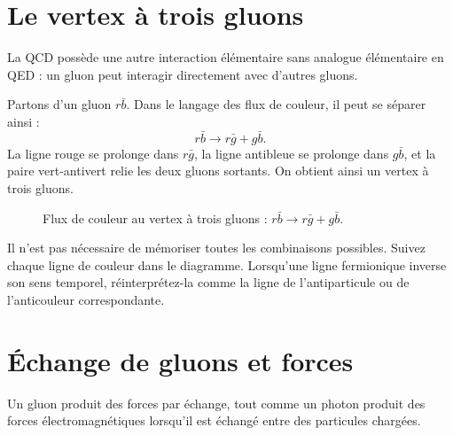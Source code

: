 \section{Le vertex à trois gluons}

La QCD possède une autre interaction élémentaire sans analogue élémentaire en QED : un gluon peut interagir directement avec d’autres gluons.

Partons d’un gluon \(r\bar b\). Dans le langage des flux de couleur, il peut se séparer ainsi :
\begin{equation}
r\bar b
\longrightarrow
r\bar g+g\bar b.
\end{equation}
La ligne rouge se prolonge dans \(r\bar g\), la ligne antibleue se prolonge dans \(g\bar b\), et la paire vert-antivert relie les deux gluons sortants. On obtient ainsi un vertex à trois gluons.

\begin{figure}[h]
\centering
{}
\caption{Flux de couleur au vertex à trois gluons : \(r\bar b\rightarrow r\bar g+g\bar b\).}
\end{figure}

Il n’est pas nécessaire de mémoriser toutes les combinaisons possibles. Suivez chaque ligne de couleur dans le diagramme. Lorsqu’une ligne fermionique inverse son sens temporel, réinterprétez-la comme la ligne de l’antiparticule ou de l’anticouleur correspondante.

\section{Échange de gluons et forces}

Un gluon produit des forces par échange, tout comme un photon produit des forces électromagnétiques lorsqu’il est échangé entre des particules chargées.

